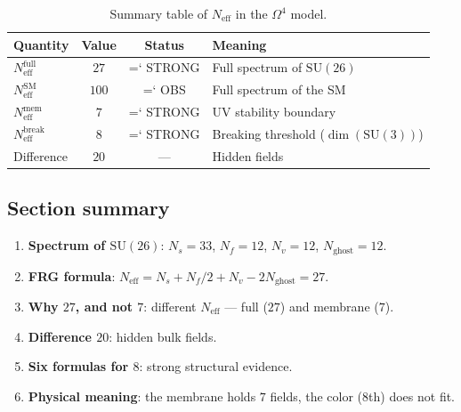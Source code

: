 \documentclass[11pt,a4paper]{article}
\newcommand{\SU}{\mathrm{SU}}
\newcommand{\Om}{\Omega^4}
\newcommand{\Neff}{N_{\text{eff}}}
\renewcommand{\texttt}[1]{{\ttfamily\hyphenchar\font=`\- #1}}
\theoremstyle{definition}
\begin{document}
\begin{table}[htbp]
\centering
\caption{Summary table of $\Neff$ in the $\Om$ model.}
\label{tab:neff-all}
\begin{tabular}{p{3.5cm}ccp{4cm}}
\toprule
Quantity & Value & Status & Meaning \\
\midrule
$\Neff^{\text{full}}$ & $27$ & \texttt{STRONG} & 
    Full spectrum of $\SU(26)$ \\[0.3em]
$\Neff^{\text{SM}}$ & $100$ & \texttt{OBS} & 
    Full spectrum of the SM \\[0.3em]
$\Neff^{\text{mem}}$ & $7$ & \texttt{STRONG} & 
    UV stability boundary \\[0.3em]
$\Neff^{\text{break}}$ & $8$ & \texttt{STRONG} & 
    Breaking threshold ($\dim(\SU(3))$) \\[0.3em]
Difference & $20$ & --- & 
    Hidden fields \\
\bottomrule
\end{tabular}
\end{table}

\subsection{Section summary}
\label{subsec:neff-summary}

\begin{enumerate}
    \item \textbf{Spectrum of $\SU(26)$}: $N_s = 33$, $N_f = 12$, 
          $N_v = 12$, $N_{\text{ghost}} = 12$.
    \item \textbf{FRG formula}: 
          $\Neff = N_s + N_f/2 + N_v - 2 N_{\text{ghost}} = 27$.
    \item \textbf{Why $27$, and not $7$}: different $N_{\text{eff}}$ — 
          full ($27$) and membrane ($7$).
    \item \textbf{Difference $20$}: hidden bulk fields.
    \item \textbf{Six formulas for $8$}: strong structural 
          evidence.
    \item \textbf{Physical meaning}: the membrane holds $7$ fields, 
          the color ($8$th) does not fit.
\end{enumerate}

\end{document}
